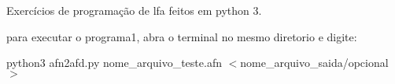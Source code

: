 Exercícios de programação de lfa feitos em python 3.

para executar o programa1, abra o terminal no mesmo diretorio e digite\+:

python3 afn2afd.\+py nome\+\_\+arquivo\+\_\+teste.\+afn $<$nome\+\_\+arquivo\+\_\+saida/opcional$>$ 